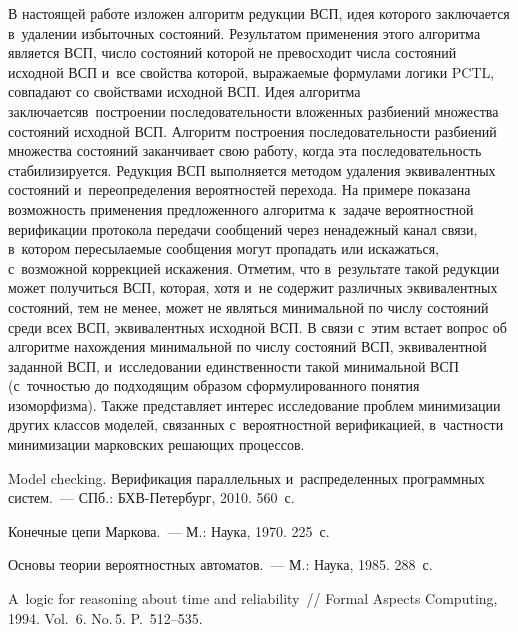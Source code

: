 \begin{multicols}{2}
В настоящей работе изложен алгоритм редукции
ВСП, идея которого
заключается в~удалении избыточных состояний.
Результатом применения этого алгоритма является ВСП,
чис\-ло со\-сто\-яний которой не превосходит
чис\-ла со\-сто\-яний исходной ВСП и~все свойства которой,
выражаемые формулами логики PCTL, совпадают со свойствами исходной ВСП.
Идея алгоритма заключается\linebreak в~по\-стро\-ении последовательности вложенных
разбиений мно\-жества состояний исходной ВСП. Алгоритм по\-стро\-ения
последовательности разбиений мно\-жества состояний заканчивает свою работу,\linebreak
когда эта последовательность стабилизируется. Редукция ВСП выполняется
методом удаления эквивалентных состояний и~переопределения вероятностей перехода.
На примере показана возможность применения предложенного алгоритма
к~задаче вероятностной верификации протокола передачи сообщений
через ненадежный канал связи, в~котором пересылаемые сообщения могут пропадать
или искажаться, с~возможной коррекцией искажения.
Отметим, что в~результате такой редукции может получиться ВСП,
которая, хотя и~не содержит различных эквивалентных состояний, тем не
менее, может не являться минимальной по числу состояний среди всех ВСП,
эквивалентных исходной ВСП.
В связи с~этим встает вопрос об
алгоритме нахождения минимальной по числу состояний ВСП,
эквивалентной заданной ВСП, и~исследовании
единственности такой минимальной ВСП (с~точ\-ностью до подходящим образом
сформулированного понятия изоморфизма).
Так\-же пред\-став\-ля\-ет интерес исследование проб\-лем минимизации других классов
моделей, связанных с~вероятностной верификацией, в~част\-ности минимизации
марковских решающих процессов.

\vspace*{-9pt}

{\small\frenchspacing
 {%
 \begin{thebibliography}{99}


 Model checking.
Верификация параллельных и~распределенных программных систем.~---
СПб.: БХВ-Петербург, 2010. 560~с.

 Конечные цепи Маркова.~--- М.: Наука, 1970. 225~с.

 Основы теории вероятностных автоматов.~--- М.: Наука, 1985. 288~с.


 A~logic for reasoning about time and
reliability~// Formal Aspects Computing, 1994. Vol.~6. No.\,5. P.~512--535.


\end{thebibliography}}}
\end{multicols}
